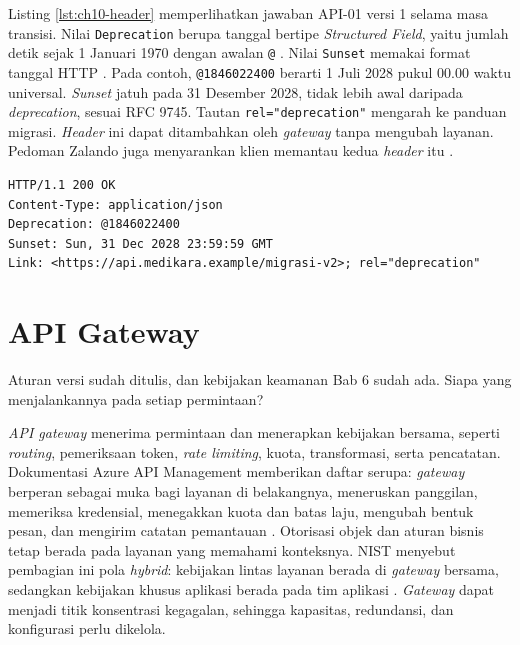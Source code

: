 \begin{pendalaman}[title={Pendalaman Teknis (opsional): Membaca Header Deprecation dan Sunset}]
Listing \ref{lst:ch10-header} memperlihatkan jawaban API-01 versi 1 selama masa transisi. Nilai \texttt{Deprecation}
berupa tanggal bertipe \textit{Structured Field}, yaitu jumlah detik sejak 1 Januari 1970 dengan awalan \texttt{@}
\cite{c10-rfc9745}. Nilai \texttt{Sunset} memakai format tanggal HTTP \cite{c10-rfc8594}. Pada contoh,
\texttt{@1846022400} berarti 1 Juli 2028 pukul 00.00 waktu universal. \textit{Sunset} jatuh pada 31 Desember 2028, tidak
lebih awal daripada \textit{deprecation}, sesuai RFC 9745. Tautan \texttt{rel="deprecation"} mengarah ke panduan
migrasi. \textit{Header} ini dapat ditambahkan oleh \textit{gateway} tanpa mengubah layanan. Pedoman Zalando juga
menyarankan klien memantau kedua \textit{header} itu \cite{zalando-guidelines}.

\begin{lstlisting}[style=ch10http, caption={Jawaban versi 1 selama masa transisi, tersedia di \berkas{sources/chapter10/contoh-header-deprecation.http}}, label={lst:ch10-header}]
HTTP/1.1 200 OK
Content-Type: application/json
Deprecation: @1846022400
Sunset: Sun, 31 Dec 2028 23:59:59 GMT
Link: <https://api.medikara.example/migrasi-v2>; rel="deprecation"
\end{lstlisting}
\end{pendalaman}

\section{API Gateway}

Aturan versi sudah ditulis, dan kebijakan keamanan Bab 6 sudah ada. Siapa yang menjalankannya pada setiap permintaan?

\textit{API gateway} menerima permintaan dan menerapkan kebijakan bersama, seperti \textit{routing}, pemeriksaan token,
\textit{rate limiting}, kuota, transformasi, serta pencatatan. Dokumentasi Azure API Management memberikan daftar
serupa: \textit{gateway} berperan sebagai muka bagi layanan di belakangnya, meneruskan panggilan, memeriksa kredensial,
menegakkan kuota dan batas laju, mengubah bentuk pesan, dan mengirim catatan pemantauan \cite{azure-apim}. Otorisasi
objek dan aturan bisnis tetap berada pada layanan yang memahami konteksnya. NIST menyebut pembagian ini pola
\textit{hybrid}: kebijakan lintas layanan berada di \textit{gateway} bersama, sedangkan kebijakan khusus aplikasi berada
pada tim aplikasi \cite{nist-sp800-228}. \textit{Gateway} dapat menjadi titik konsentrasi kegagalan, sehingga
kapasitas, redundansi, dan konfigurasi perlu dikelola.

